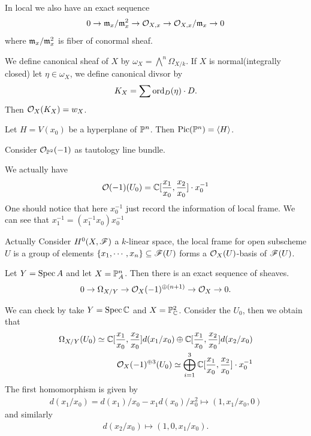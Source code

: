 {\np In local we also have an exact sequence
\begin{align*}
    0\to \m_x/\m_x^2 \to \o_{X,x} \to \o_{X,x}/{\m_x} \to 0 
\end{align*}
where $\m_x/\m_x^2$ is fiber of conormal sheaf.

\np We define canonical sheaf of $X$ by $\omega_X=\bigwedge^n\Omega_{X/k}$.
If $X$ is normal(integrally closed) let $\eta\in \omega_X$, we define canonical divsor by 
\begin{align*}
    K_X = \sum \ord_D(\eta) \cdot D.
\end{align*}
Then $\o_X(K_X) = w_X$.

\np Let $H=V(x_0)$ be a hyperplane of $\P^n$. Then $\pic(\P^n)=\langle H \rangle$.

\np Consider $\o_{\P^{2}}(-1)$ as tautology line bundle. 

We actually have 
\begin{align*}
    \o(-1)(U_0) = \C[\frac{x_1}{x_0},\frac{x_2}{x_0}]\cdot x_0^{-1} 
\end{align*}
One should notice that here $x_0^{-1}$ just record the information of local frame. 
We can see that $x_1^{-1}=(x_1^{-1}x_0)x_0^{-1}$

\np Actually Consider $H^0(X,\f)$ a $k$-linear space, the local frame for open subscheme $U$ is a group of elements $\{x_1,\cdots,x_n\}\subseteq \f(U)$ forms a $\o_X(U)$-basis of $\f(U)$.



\np Let $Y=\spec A$ and let $X=\P^n_A$. Then there is an exact sequence of sheaves.
\begin{align*}
    0\to \Omega_{X/Y} \to \o_X(-1)^{\oplus (n+1)}\to \o_X\to 0.
\end{align*}

We can check by take $Y=\spec\C$ and $X=\P^2_\C$. Consider the $U_0$, then we obtain that 
\begin{align*}
    \Omega_{X/Y}(U_0) \simeq \C[\frac{x_1}{x_0},\frac{x_2}{x_0}] d(x_1/x_0)\oplus \C[\frac{x_1}{x_0},\frac{x_2}{x_0}] d(x_2/x_0) \\
    \o_X(-1)^{\oplus 3}(U_0) \simeq \bigoplus_{i=1}^3 \C[\frac{x_1}{x_0},\frac{x_2}{x_0}]\cdot x_0^{-1}\\
\end{align*}
The first homomorphism is given by 
\begin{align*}
    d(x_1/x_0) = d(x_1)/x_0-x_1d(x_0)/x_0^2 \mapsto (1,x_1/x_0,0)
\end{align*}
and similarly
\begin{align*}
     d(x_2/x_0)  \mapsto (1,0,x_1/x_0).
\end{align*}

}
